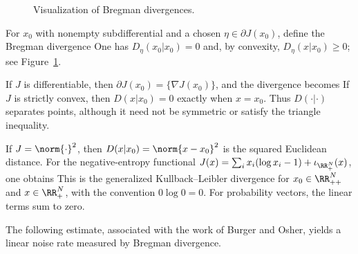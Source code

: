 \begin{figure}[tbp]
\centering
{}
\caption{Visualization of Bregman divergences.}
\label{fig-bregman}
\end{figure}

For $x_0$ with nonempty subdifferential and a chosen $\eta \in \partial J(x_0)$, define the Bregman divergence
One has $D_\eta(x_0|x_0)=0$ and, by convexity, $D_\eta(x|x_0)\geq0$; see Figure~\ref{fig-bregman}.

If $J$ is differentiable, then $\partial J(x_0)=\{\nabla J(x_0)\}$, and the divergence becomes
If $J$ is strictly convex, then $D(x|x_0)=0$ exactly when $x=x_0$. Thus $D(\cdot|\cdot)$ separates points, although it need not be symmetric or satisfy the triangle inequality.

If $J=\norm{\cdot}^2$, then $D(x|x_0) = \norm{x-x_0}^2$ is the squared Euclidean distance.
%
For the negative-entropy functional $J(x)=\sum_i x_i(\log x_i-1)+\iota_{\RR_+^N}(x)$, one obtains
This is the generalized Kullback--Leibler divergence for $x_0\in\RR_{++}^N$ and $x\in\RR_+^N$, with the convention $0\log0=0$. For probability vectors, the linear terms sum to zero.

The following estimate, associated with the work of Burger and Osher, yields a linear noise rate measured by Bregman divergence.

